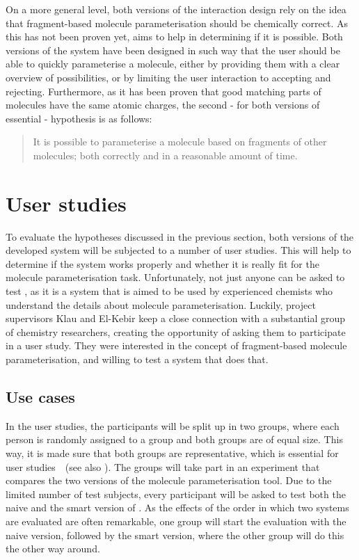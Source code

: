 On a more general level, both versions of the interaction design rely on the idea that fragment-based molecule parameterisation should be chemically correct. As this has not been proven yet, \oframp{} aims to help in determining if it is possible. Both versions of the system have been designed in such way that the user should be able to quickly parameterise a molecule, either by providing them with a clear overview of possibilities, or by limiting the user interaction to accepting and rejecting. Furthermore, as it has been proven that good matching parts of molecules have the same atomic charges, the second - for both versions of \oframp{} essential - hypothesis is as follows:
\begin{quote}
It is possible to parameterise a molecule based on fragments of other molecules; both correctly and in a reasonable amount of time.
\end{quote}


\section{User studies}
To evaluate the hypotheses discussed in the previous section, both versions of the developed system will be subjected to a number of user studies. This will help to determine if the system works properly and whether it is really fit for the molecule parameterisation task. Unfortunately, not just anyone can be asked to test \oframp, as it is a system that is aimed to be used by experienced chemists who understand the details about molecule parameterisation. Luckily, project supervisors Klau and El-Kebir keep a close connection with a substantial group of chemistry researchers, creating the opportunity of asking them to participate in a user study. They were interested in the concept of fragment-based molecule parameterisation, and willing to test a system that does that.

\subsection{Use cases}
In the user studies, the participants will be split up in two groups, where each person is randomly assigned to a group and both groups are of equal size. This way, it is made sure that both groups are representative, which is essential for user studies~\cite{wohlin2003empirical}~(see also ). The groups will take part in an experiment that compares the two versions of the molecule parameterisation tool. Due to the limited number of test subjects, every participant will be asked to test both the naive and the smart version of \oframp. As the effects of the order in which two systems are evaluated are often remarkable, one group will start the evaluation with the naive version, followed by the smart version, where the other group will do this the other way around.

